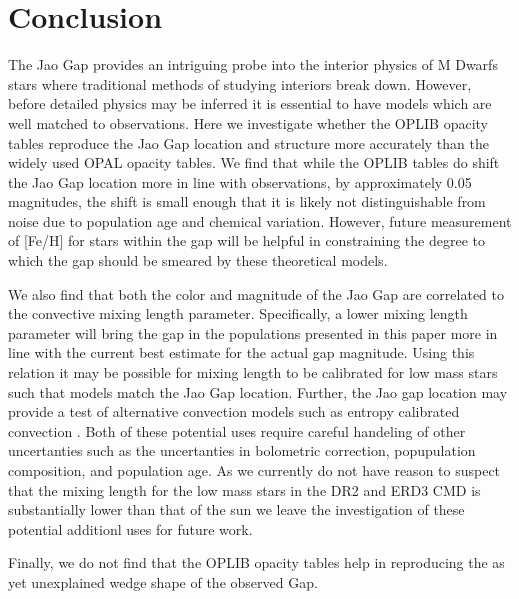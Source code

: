 \section{Conclusion}\label{sec:conclusion}
The Jao Gap provides an intriguing probe into the interior physics of M Dwarfs
stars where traditional methods of studying interiors break down. However,
before detailed physics may be inferred it is essential to have models which
are well matched to observations. Here we investigate whether the OPLIB opacity
tables reproduce the Jao Gap location and structure more accurately than the
widely used OPAL opacity tables. We find that while the OPLIB tables do shift
the Jao Gap location more in line with observations, by approximately 0.05
magnitudes, the shift is small enough that it is likely not distinguishable
from noise due to population age and chemical variation. However, future
measurement of [Fe/H] for stars within the gap will be helpful in constraining
the degree to which the gap should be smeared by these theoretical models.

We also find that both the color and magnitude of the Jao Gap are
correlated to the convective mixing length parameter. Specifically, a lower
mixing length parameter will bring the gap in the populations presented in this
paper more in line with the current best estimate for the actual gap magnitude.
Using this relation it may be possible for mixing length to be calibrated for
low mass stars such that models match the Jao Gap location. Further, the Jao
gap location may provide a test of alternative convection models such as
entropy calibrated convection \citep{Spada2021}. Both of these potential uses
require careful handeling of other uncertanties such as the uncertanties in
bolometric correction, popupulation composition, and population age. As we
currently do not have reason to suspect that the mixing length for the low mass
stars in the DR2 and ERD3 CMD is substantially lower than that of the sun we
leave the investigation of these potential additionl uses for future work.

Finally, we do not find that the OPLIB opacity tables help in reproducing the
as yet unexplained wedge shape of the observed Gap.
